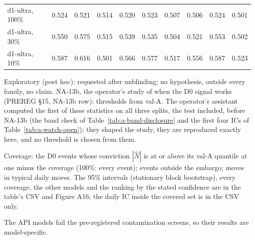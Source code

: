 \begin{table}[htbp]
\begin{threeparttable}
\begin{tabular}{@{}lS[table-format=1.3]S[table-format=1.3]S[table-format=1.3]S[table-format=1.3]S[table-format=1.3]S[table-format=1.3]S[table-format=1.3]S[table-format=1.3]S[table-format=1.3]@{}}
d1-ultra, 100\% & 0.524 & 0.521 & 0.514 & 0.520 & 0.523 & 0.507 & 0.506 & 0.524 & 0.501 \\
d1-ultra, 30\% & 0.550 & 0.575 & 0.515 & 0.539 & 0.535 & 0.504 & 0.521 & 0.553 & 0.502 \\
d1-ultra, 10\% & 0.587 & 0.616 & 0.501 & 0.566 & 0.577 & 0.517 & 0.556 & 0.587 & 0.523 \\
\bottomrule
\end{tabular}
\begin{tablenotes}[flushleft]\footnotesize
\item Exploratory (post hoc): requested after unblinding; no hypothesis, outside every family, no claim. NA-13b, the operator's study of when the D0 signal works (PREREG \S15, NA-13b row): thresholds from val-A. The operator's assistant computed the first of these statistics on all three splits, the test included, before NA-13b (the band check of Table~\ref{tab:a-band-disclosure} and the first four ICs of Table~\ref{tab:a-watch-open}); they shaped the study, they are reproduced exactly here, and no threshold is chosen from them.
\item Coverage: the D0 events whose conviction $|\hat N|$ is at or above its val-A quantile at one minus the coverage (100\%: every event); events outside the embargo; moves in typical daily moves. The 95\% intervals (stationary block bootstrap), every coverage, the other models and the ranking by the stated confidence are in the table's CSV and Figure A16; the daily IC inside the covered set is in the CSV only.
\item The API models fail the pre-registered contamination screens, so their results are model-specific.
\end{tablenotes}
\end{threeparttable}
\end{table}
